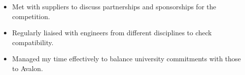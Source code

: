 \documentclass[9pt]{developercv} %
\begin{document}
\begin{entrylist}
{\begin{itemize}
					\item[$\bullet$\hspace*{0.5cm}] Met with suppliers to discuss partnerships and sponsorships for the competition.
					\item[$\bullet$\hspace*{0.5cm}] Regularly liaised with engineers from different disciplines to check compatibility.
					\item[$\bullet$\hspace*{0.5cm}] Managed my time effectively to balance university commitments with those to Avalon.
				\end{itemize}		
			}
	\end{entrylist}


	\newpage
\end{document}
